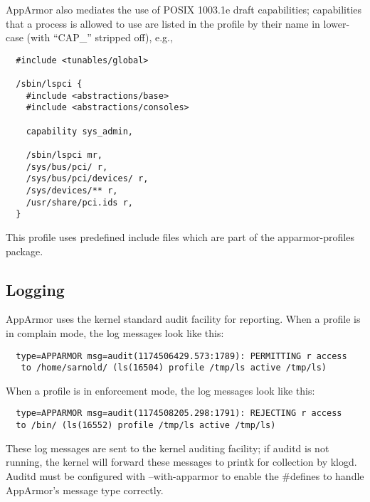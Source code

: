 \documentclass[a4paper]{article}
\begin{document}
AppArmor also mediates the use of POSIX 1003.1e draft capabilities;
capabilities that a process is allowed to use are listed in the
profile by their name in lower-case (with ``CAP\_'' stripped off), e.g.,

\begin{small}
\begin{verbatim}
  #include <tunables/global>

  /sbin/lspci {
    #include <abstractions/base>
    #include <abstractions/consoles>

    capability sys_admin,

    /sbin/lspci mr,
    /sys/bus/pci/ r,
    /sys/bus/pci/devices/ r,
    /sys/devices/** r,
    /usr/share/pci.ids r,
  }
\end{verbatim}
\end{small}

This profile uses predefined include files which are part of the
apparmor-profiles package.

\subsection{Logging}

AppArmor uses the kernel standard audit facility for reporting.  When a
profile is in complain mode, the log messages look like this:

\begin{small}
\begin{verbatim}
  type=APPARMOR msg=audit(1174506429.573:1789): PERMITTING r access
   to /home/sarnold/ (ls(16504) profile /tmp/ls active /tmp/ls)
\end{verbatim}
\end{small}

When a profile is in enforcement mode, the log messages look like this:

\begin{small}
\begin{verbatim}
  type=APPARMOR msg=audit(1174508205.298:1791): REJECTING r access
  to /bin/ (ls(16552) profile /tmp/ls active /tmp/ls)
\end{verbatim}
\end{small}

These log messages are sent to the kernel auditing facility; if auditd
is not running, the kernel will forward these messages to printk for
collection by klogd. Auditd must be configured with --with-apparmor to
enable the \#defines to handle AppArmor's message type correctly.
\end{document}
